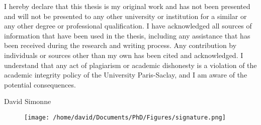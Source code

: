 I hereby declare that this thesis is my original work and has not been presented and will not be presented to any other university or institution for a similar or any other degree or professional qualification.
I have acknowledged all sources of information that have been used in the thesis, including any assistance that has been received during the research and writing process.
Any contribution by individuals or sources other than my own has been cited and acknowledged.
I understand that any act of plagiarism or academic dishonesty is a violation of the academic integrity policy of the University Paris-Saclay, and I am aware of the potential consequences.

\vspace{1cm}

David Simonne

\vspace{1cm}

\begin{figure}[!htb]
    \raggedleft
    \texttt{[image: /home/david/Documents/PhD/Figures/signature.png]}
\end{figure}
